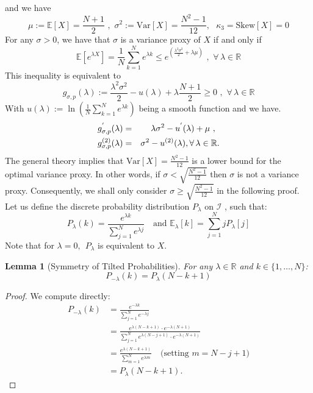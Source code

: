 \documentclass[a4paper, 10pt]{article}
\newcommand{\E}{\mathbb{E}}
\newcommand{\beq}{\begin{equation}}
\newcommand{\eeq}{\end{equation}}
\newcommand{\bea}{\begin{eqnarray}}
\newcommand{\eea}{\end{eqnarray}}
\newtheorem{lemma}{Lemma}[section]
\theoremstyle{definition}
\begin{document}
and we have  \beq \mu:=\E[X]=\frac{N+1}{2}\,\,,\,\, \sigma^2:=\text{Var}[X]=\frac{N^2-1}{12}, \ \ \ \kappa_3=\text{Skew}[X]=0 \eeq
For any $\sigma>0$, we have that $\sigma$ is a variance proxy of $X$ if and only if \beq \label{eq:mgf_inequality} \E\left[e^{\lambda X}\right]=  \frac{1}{N}\sum_{k=1}^{N} e^{\lambda k} \leq e^{(\frac{\lambda^2\sigma^2}{2}+\lambda \mu)} \,\, ,\,\, \forall \, \lambda\in \mathbb{R}\eeq This inequality is equivalent to \beq g_{\sigma,p}(\lambda):=\frac{\lambda^2\sigma^2}{2}-u(\lambda)+\lambda \frac{N+1}{2} \geq 0 \,\,,\,\,  \forall \, \lambda\in \mathbb{R}\eeq With  $u(\lambda) := \ln\left(\frac{1}{N}\sum_{k=1}^{N} e^{\lambda k}\right)$ being a smooth function and we have.\\
\bea g^{'}_{\sigma,p}(\lambda) &=& \lambda \sigma^2 -u^{'}(\lambda) + \mu \,\,,\,\ \cr 
g^{(2)}_{\sigma,p}(\lambda) &=& \sigma^2 -u^{(2)}(\lambda),  \forall \, \lambda\in \mathbb{R}. \eea The general theory implies that $\text{Var}[X]=\frac{N^2-1}{12}$ is a lower bound for the optimal variance proxy. In other words, if $\sigma<\sqrt{\frac{N^2-1}{12}}$ then $\sigma$ is not a variance proxy. Consequently, we shall only consider $\sigma\geq \sqrt{\frac{N^2-1}{12}}$ in the following proof.\\Let us define the discrete probability distribution  $P_{\lambda}$ on $\mathcal{I}$ , such that: \beq P_{\lambda}(k) = \frac{e^{\lambda k}}{\sum_{j=1}^{N} e^{\lambda j}} \ \ \ \text{ and } \mathbb{E_{\lambda}}[k] = {\sum_{j=1}^{N}j P_{\lambda}[j]}\eeq 
Note that for $\lambda=0 , \ \ P_\lambda$ is equivalent to $X$.\\
\begin{lemma}[Symmetry of Tilted Probabilities]\label{lem:symmetry}
For any $\lambda \in \mathbb{R}$ and $k \in \{1,\ldots,N\}$:
\begin{equation}
P_{-\lambda}(k) = P_{\lambda}(N-k+1)
\end{equation}
\end{lemma}

\begin{proof}
We compute directly:
\begin{align*}
P_{-\lambda}(k) &= \frac{e^{-\lambda k}}{\sum_{j=1}^N e^{-\lambda j}} \\
&= \frac{e^{\lambda (N - k + 1)} \cdot e^{-\lambda (N + 1)}}{\sum_{j=1}^N e^{\lambda (N - j + 1)} \cdot e^{-\lambda (N + 1)}}  \\
&= \frac{e^{\lambda (N - k + 1)}}{\sum_{m=1}^N e^{\lambda m}} \quad \text{(setting $m = N-j+1$)} \\
&= P_{\lambda}(N - k + 1). 
\end{align*}
\end{proof}
\end{document}
